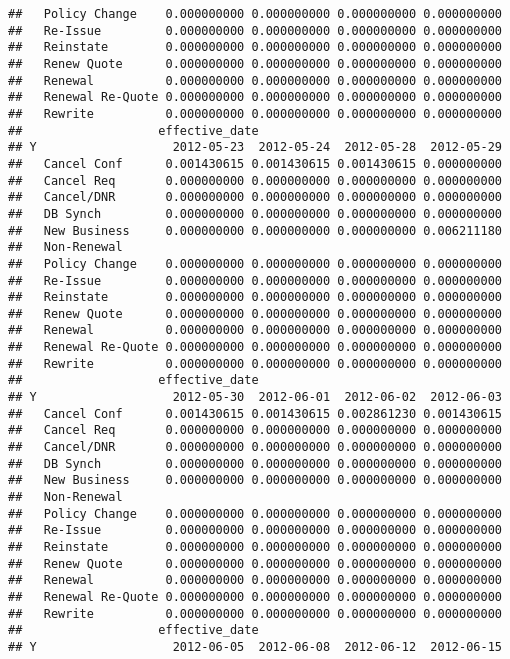 \documentclass[]{article}
\begin{document}
\begin{verbatim}
##   Policy Change    0.000000000 0.000000000 0.000000000 0.000000000
##   Re-Issue         0.000000000 0.000000000 0.000000000 0.000000000
##   Reinstate        0.000000000 0.000000000 0.000000000 0.000000000
##   Renew Quote      0.000000000 0.000000000 0.000000000 0.000000000
##   Renewal          0.000000000 0.000000000 0.000000000 0.000000000
##   Renewal Re-Quote 0.000000000 0.000000000 0.000000000 0.000000000
##   Rewrite          0.000000000 0.000000000 0.000000000 0.000000000
##                   effective_date
## Y                   2012-05-23  2012-05-24  2012-05-28  2012-05-29
##   Cancel Conf      0.001430615 0.001430615 0.001430615 0.000000000
##   Cancel Req       0.000000000 0.000000000 0.000000000 0.000000000
##   Cancel/DNR       0.000000000 0.000000000 0.000000000 0.000000000
##   DB Synch         0.000000000 0.000000000 0.000000000 0.000000000
##   New Business     0.000000000 0.000000000 0.000000000 0.006211180
##   Non-Renewal                                                     
##   Policy Change    0.000000000 0.000000000 0.000000000 0.000000000
##   Re-Issue         0.000000000 0.000000000 0.000000000 0.000000000
##   Reinstate        0.000000000 0.000000000 0.000000000 0.000000000
##   Renew Quote      0.000000000 0.000000000 0.000000000 0.000000000
##   Renewal          0.000000000 0.000000000 0.000000000 0.000000000
##   Renewal Re-Quote 0.000000000 0.000000000 0.000000000 0.000000000
##   Rewrite          0.000000000 0.000000000 0.000000000 0.000000000
##                   effective_date
## Y                   2012-05-30  2012-06-01  2012-06-02  2012-06-03
##   Cancel Conf      0.001430615 0.001430615 0.002861230 0.001430615
##   Cancel Req       0.000000000 0.000000000 0.000000000 0.000000000
##   Cancel/DNR       0.000000000 0.000000000 0.000000000 0.000000000
##   DB Synch         0.000000000 0.000000000 0.000000000 0.000000000
##   New Business     0.000000000 0.000000000 0.000000000 0.000000000
##   Non-Renewal                                                     
##   Policy Change    0.000000000 0.000000000 0.000000000 0.000000000
##   Re-Issue         0.000000000 0.000000000 0.000000000 0.000000000
##   Reinstate        0.000000000 0.000000000 0.000000000 0.000000000
##   Renew Quote      0.000000000 0.000000000 0.000000000 0.000000000
##   Renewal          0.000000000 0.000000000 0.000000000 0.000000000
##   Renewal Re-Quote 0.000000000 0.000000000 0.000000000 0.000000000
##   Rewrite          0.000000000 0.000000000 0.000000000 0.000000000
##                   effective_date
## Y                   2012-06-05  2012-06-08  2012-06-12  2012-06-15

\end{verbatim}
\end{document}
